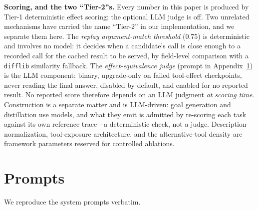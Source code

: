\noindent\textbf{Scoring, and the two ``Tier-2''s.} Every number in this paper
is produced by Tier-1 deterministic effect scoring; the optional LLM judge is
off. Two unrelated mechanisms have carried the name ``Tier-2'' in our
implementation, and we separate them here. The \emph{replay argument-match
threshold} (0.75) is deterministic and involves no model: it decides when a
candidate's call is close enough to a recorded call for the cached result to
be served, by field-level comparison with a \texttt{difflib} similarity
fallback. The \emph{effect-equivalence judge} (prompt in
Appendix~\ref{app:prompts}) is the LLM component: binary, upgrade-only on
failed tool-effect checkpoints, never reading the final answer, disabled by
default, and enabled for no reported result. No reported score therefore
depends on an LLM judgment \emph{at scoring time}. Construction is a separate
matter and is LLM-driven: goal generation and distillation use models, and
what they emit is admitted by re-scoring each task against its own reference
trace---a deterministic check, not a judge.
Description-normalization, tool-exposure architecture,
and the alternative-tool density are framework parameters reserved for
controlled ablations.

\section{Prompts}
\label{app:prompts}
We reproduce the system prompts verbatim.

